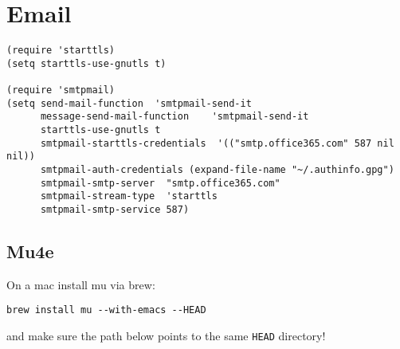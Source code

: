 \documentclass[12pt]{article}
\begin{document}
\section{Email}
\label{sec:org386beb2}


\begin{verbatim}
(require 'starttls)
(setq starttls-use-gnutls t)

(require 'smtpmail)
(setq send-mail-function  'smtpmail-send-it
      message-send-mail-function    'smtpmail-send-it
      starttls-use-gnutls t
      smtpmail-starttls-credentials  '(("smtp.office365.com" 587 nil nil))
      smtpmail-auth-credentials (expand-file-name "~/.authinfo.gpg")
      smtpmail-smtp-server  "smtp.office365.com"
      smtpmail-stream-type  'starttls
      smtpmail-smtp-service 587)

\end{verbatim}

\subsection{Mu4e}
\label{sec:org26b7cb4}

On a mac install mu via brew:

\begin{verbatim}
brew install mu --with-emacs --HEAD
\end{verbatim}

and make sure the path below points to the same \texttt{HEAD} directory!
\end{document}
